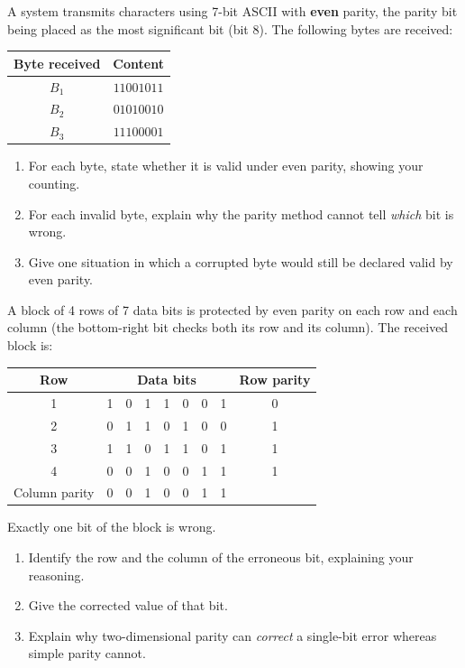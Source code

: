 \documentclass[11pt]{article}
\begin{document}
\begin{exercice}
A system transmits characters using 7-bit ASCII with \textbf{even} parity, the parity bit being placed as the most significant bit (bit 8). The following bytes are received:
\begin{center}
\begin{tabular}{|c|c|}
\hline
\rowcolor{popblueL} Byte received & Content \\
\hline
$B_1$ & $11001011$ \\
\hline
$B_2$ & $01010010$ \\
\hline
$B_3$ & $11100001$ \\
\hline
\end{tabular}
\end{center}
\begin{enumerate}
\item For each byte, state whether it is valid under even parity, showing your counting.
\item For each invalid byte, explain why the parity method cannot tell \emph{which} bit is wrong.
\item Give one situation in which a corrupted byte would still be declared valid by even parity.
\end{enumerate}
\end{exercice}

\begin{exercice}
A block of 4 rows of 7 data bits is protected by even parity on each row and each column (the bottom-right bit checks both its row and its column). The received block is:
\begin{center}
\begin{tabular}{|c|ccccccc|c|}
\hline
\rowcolor{popblueL} Row & \multicolumn{7}{c|}{Data bits} & Row parity \\
\hline
1 & 1 & 0 & 1 & 1 & 0 & 0 & 1 & 0 \\
\hline
2 & 0 & 1 & 1 & 0 & 1 & 0 & 0 & 1 \\
\hline
3 & 1 & 1 & 0 & 1 & 1 & 0 & 1 & 1 \\
\hline
4 & 0 & 0 & 1 & 0 & 0 & 1 & 1 & 1 \\
\hline
\rowcolor{popblueL} Column parity & 0 & 0 & 1 & 0 & 0 & 1 & 1 & \\
\hline
\end{tabular}
\end{center}
Exactly one bit of the block is wrong.
\begin{enumerate}
\item Identify the row and the column of the erroneous bit, explaining your reasoning.
\item Give the corrected value of that bit.
\item Explain why two-dimensional parity can \emph{correct} a single-bit error whereas simple parity cannot.
\end{enumerate}
\end{exercice}
\end{document}
